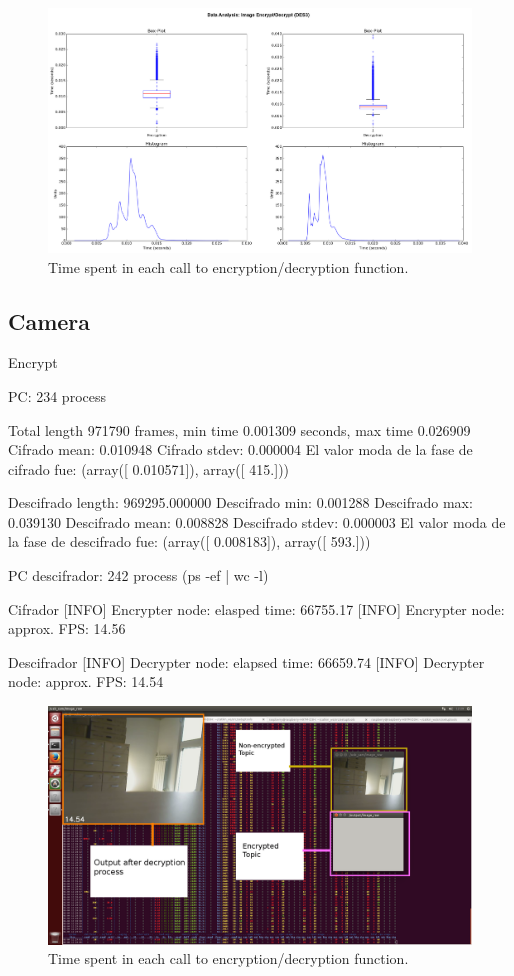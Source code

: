 \documentclass[journal,twoside]{JoPhA}
\begin{document}
\begin{figure}[ht]
    \centering
    \includegraphics[width=.9\textwidth]{Resumen_llamada_funcion.png}
    \caption{Time spent in each call to encryption/decryption function.}
  \label{fig:Conceptualmodel}
\end{figure}


\subsection{Camera}
Encrypt

PC: 234 process

Total length 971790 frames, min time 0.001309 seconds, max time  0.026909
Cifrado mean: 0.010948
Cifrado stdev: 0.000004
El valor moda de la fase de cifrado fue:
(array([ 0.010571]), array([ 415.]))

Descifrado length: 969295.000000
Descifrado min: 0.001288
Descifrado max: 0.039130
Descifrado mean: 0.008828
Descifrado stdev: 0.000003
El valor moda de la fase de descifrado fue:
(array([ 0.008183]), array([ 593.]))


PC descifrador: 242 process (ps -ef | wc -l)

Cifrador
[INFO] Encrypter node:  elasped time: 66755.17
[INFO] Encrypter node:  approx. FPS: 14.56



Descifrador
[INFO] Decrypter node: elapsed time: 66659.74
[INFO] Decrypter node: approx. FPS: 14.54



\begin{figure}[ht]
    \centering
    \includegraphics[width=.5\textwidth]{Screenshot.png}
    \caption{Time spent in each call to encryption/decryption function.}
  \label{fig:Conceptualmodel}
\end{figure}
\end{document}
